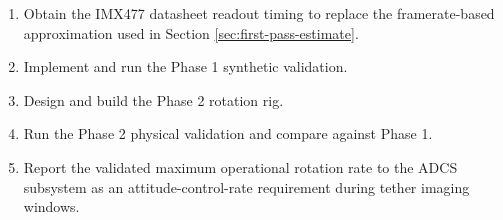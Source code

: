 \begin{enumerate}
    \item Obtain the IMX477 datasheet readout timing to replace the framerate-based approximation used in Section \ref{sec:first-pass-estimate}.
    \item Implement and run the Phase 1 synthetic validation.
    \item Design and build the Phase 2 rotation rig.
    \item Run the Phase 2 physical validation and compare against Phase 1.
    \item Report the validated maximum operational rotation rate to the ADCS subsystem as an attitude-control-rate requirement during tether imaging windows.
\end{enumerate}
